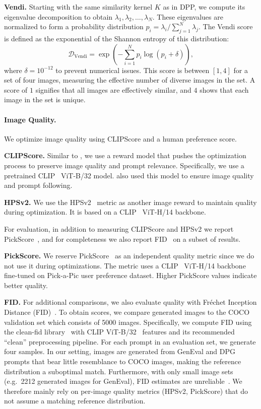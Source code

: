 \documentclass[10pt,twocolumn,letterpaper]{article}
\begin{document}
\noindent \textbf{Vendi.} Starting with the same similarity kernel $K$ as in DPP, we compute its eigenvalue decomposition to obtain $\lambda_1, \lambda_2, \ldots, \lambda_N$. These eigenvalues are normalized to form a probability distribution $p_i = \lambda_i / \sum_{j=1}^N \lambda_j$. The Vendi score~\cite{friedman2022vendi} is defined as the exponential of the Shannon entropy of this distribution:
\begin{equation}
\mathcal{D}_{\text{Vendi}} = \exp\left(-\sum_{i=1}^N p_i \log(p_i + \delta)\right),
\end{equation}
where $\delta = 10^{-12}$ to prevent numerical issues.
This score is between $[1,4]$ for a set of four images, measuring the effective number of diverse images in the set. A score of $1$ signifies that all images are effectively similar, and $4$ shows that each image in the set is unique. 

\paragraph{Image Quality.}
We optimize image quality using CLIPScore and a human preference score. 

\noindent \textbf{CLIPScore.} Similar to \cite{reno}, we use a reward model that pushes the optimization process to preserve image quality and prompt relevance. Specifically, we use a pretrained CLIP~\cite{clip} ViT-B/32 model. \cite{gi} also used this model to ensure image quality and prompt following.

\noindent \textbf{HPSv2.} We use the HPSv2~\cite{hpsv2} metric as another image reward to maintain quality during optimization. It is based on a CLIP~\cite{clip} ViT-H/14 backbone.

For evaluation, in addition to measuring CLIPScore and HPSv2 we report PickScore~\cite{pickscore}, and for completeness we also report FID~\cite{heusel2017gans} on a subset of results. 

\noindent \textbf{PickScore.} We reserve PickScore~\cite{pickscore} as an independent quality metric since we do not use it during optimizations.  The metric uses a CLIP~\cite{clip} ViT-H/14 backbone fine-tuned on Pick-a-Pic user preference dataset. Higher PickScore values indicate better quality.

\noindent \textbf{FID.} For additional comparisons, we also evaluate quality with Fr\'{e}chet Inception Distance (FID)~\cite{heusel2017gans}. To obtain scores, we compare generated images to the COCO~\cite{mscoco} validation set which consists of 5000 images. 
Specifically, we compute FID using the clean-fid library~\cite{parmar2021cleanfid} with CLIP ViT-B/32~\cite{clip} features and its recommended ``clean'' preprocessing pipeline.
For each prompt in an evaluation set, we generate four samples. 
In our setting, images are generated from GenEval and DPG prompts that bear little resemblance to COCO images, making the reference distribution a suboptimal match. Furthermore, with only small image sets (e.g.\ 2212 generated images for GenEval), FID estimates are unreliable~\cite{binkowski2018demystifying}. We therefore mainly rely on per-image quality metrics (HPSv2, PickScore) that do not assume a matching reference distribution. 
\end{document}
